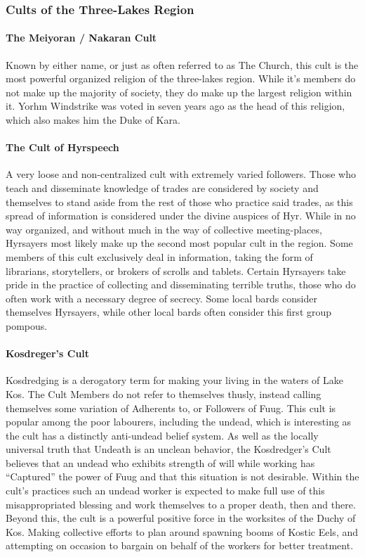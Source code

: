 \subsubsection{Cults of the Three-Lakes Region}
\paragraph{The Meiyoran / Nakaran Cult}
Known by either name, or just as often referred to as The Church, this cult is the most powerful organized religion of the three-lakes region. While it’s members do not make up the majority of society, they do make up the largest religion within it. Yorhm Windstrike was voted in seven years ago as the head of this religion, which also makes him the Duke of Kara.

\paragraph{The Cult of Hyrspeech}
A very loose and non-centralized cult with extremely varied followers. Those who teach and disseminate knowledge of trades are considered by society and themselves to stand aside from the rest of those who practice said trades, as this spread of information is considered under the divine auspices of Hyr. While in no way organized, and without much in the way of collective meeting-places, Hyrsayers most likely make up the second most popular cult in the region. Some members of this cult exclusively deal in information, taking the form of librarians, storytellers, or brokers of scrolls and tablets. Certain Hyrsayers take pride in the practice of collecting and disseminating terrible truths, those who do often work with a necessary degree of secrecy. Some local bards consider themselves Hyrsayers, while other local bards often consider this first group pompous.

\paragraph{Kosdreger’s Cult}
Kosdredging is a derogatory term for making your living in the waters of Lake Kos. The Cult Members do not refer to themselves thusly, instead calling themselves some variation of Adherents to, or Followers of Fuug. This cult is popular among the poor labourers, including the undead, which is interesting as the cult has a distinctly anti-undead belief system. As well as the locally universal truth that Undeath is an unclean behavior, the Kosdredger’s Cult believes that an undead who exhibits strength of will while working has “Captured” the power of Fuug and that this situation is not desirable. Within the cult’s practices such an undead worker is expected to make full use of this misappropriated blessing and work themselves to a proper death, then and there. Beyond this, the cult is a powerful positive force in the worksites of the Duchy of Kos. Making collective efforts to plan around spawning booms of Kostic Eels, and attempting on occasion to bargain on behalf of the workers for better treatment.

